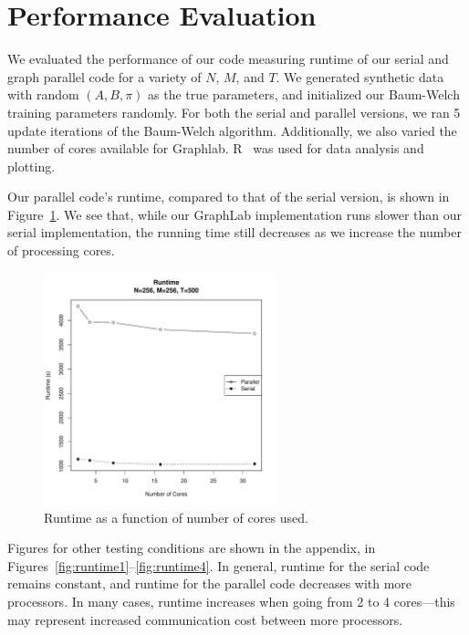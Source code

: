 \section{Performance Evaluation}

We evaluated the performance of our code measuring runtime of our serial and
graph parallel code for a variety of $N$, $M$, and $T$. We generated synthetic
data with random $(A, B, \pi)$ as the true parameters, and initialized our
Baum-Welch training parameters randomly. For both the serial and parallel
versions, we ran 5 update iterations of the Baum-Welch algorithm.  Additionally,
we also varied the number of cores available for Graphlab. R~\cite{r} was used
for data analysis and plotting. 

Our parallel code's runtime, compared to that of the serial version, is shown in
Figure~\ref{fig:runtime-256-500}. We see that, while our GraphLab implementation
runs slower than our serial implementation, the running time still decreases as
we increase the number of processing cores. 

\begin{figure}[htb]
    \centering
    \includegraphics[width=0.6\textwidth]{../figure/runtime-N_256-T_500.pdf}
    \caption{Runtime as a function of number of cores used.}
    \label{fig:runtime-256-500}
\end{figure}

Figures for other testing conditions are shown in the appendix, in
Figures~\ref{fig:runtime1}--\ref{fig:runtime4}. In general, runtime for the
serial code remains constant, and runtime for the parallel code decreases with
more processors. In many cases, runtime increases when going from 2 to 4
cores---this may represent increased communication cost between more processors. 

